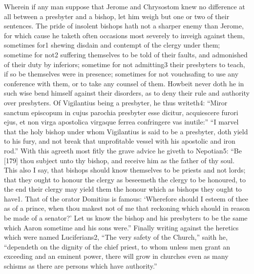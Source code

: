 Wherein if any man suppose that Jerome and Chrysostom knew no difference at all between a presbyter and a bishop, let him weigh but one or two of their sentences. The pride of insolent bishops hath not a sharper enemy than Jerome, for which cause he taketh often occasions most severely to inveigh against them, sometimes for1 shewing disdain and contempt of the clergy under them; sometime for not2 suffering themselves to be told of their faults, and admonished of their duty by inferiors; sometime for not admitting3 their presbyters to teach, if so be themselves were in presence; sometimes for not vouchsafing to use any conference with them, or to take any counsel of them. Howbeit never doth he in such wise bend himself against their disorders, as to deny their rule and authority over presbyters. Of Vigilantius being a presbyter, he thus writeth4: “Miror sanctum episcopum in cujus parochia presbyter esse dicitur, acquiescere furori ejus, et non virga apostolica virgaque ferrea confringere vas inutile:” “I marvel that the holy bishop under whom Vigilantius is said to be a presbyter, doth yield to his fury, and not break that unprofitable vessel with his apostolic and iron rod.” With this agreeth most fitly the grave advice he giveth to Nepotian5: “Be [179] thou subject unto thy bishop, and receive him as the father of thy soul. This also I say, that bishops should know themselves to be priests and not lords; that they ought to honour the clergy as beseemeth the clergy to be honoured, to the end their clergy may yield them the honour which as bishops they ought to have1. That of the orator Domitius is famous: ‘Wherefore should I esteem of thee as of a prince, when thou makest not of me that reckoning which should in reason be made of a senator?’ Let us know the bishop and his presbyters to be the same which Aaron sometime and his sons were.” Finally writing against the heretics which were named Luciferians2, “The very safety of the Church,” saith he, “dependeth on the dignity of the chief priest, to whom unless men grant an exceeding and an eminent power, there will grow in churches even as many schisms as there are persons which have authority.”

